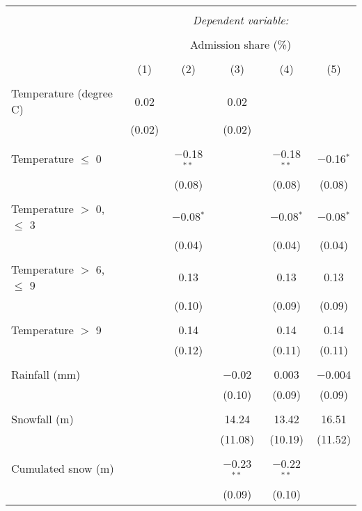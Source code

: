 
\begin{tabular}{@{\extracolsep{5pt}}lccccc} 
\\[-1.8ex]\hline 
\hline \\[-1.8ex] 
 & \multicolumn{5}{c}{\textit{Dependent variable:}} \\ 
\cline{2-6} 
\\[-1.8ex] & \multicolumn{5}{c}{Admission share (\%)} \\ 
\\[-1.8ex] & (1) & (2) & (3) & (4) & (5)\\ 
\hline \\[-1.8ex] 
 Temperature (degree C) & 0.02 &  & 0.02 &  &  \\ 
  & (0.02) &  & (0.02) &  &  \\ 
  & & & & & \\ 
 Temperature $\le$ 0 &  & $-$0.18$^{**}$ &  & $-$0.18$^{**}$ & $-$0.16$^{*}$ \\ 
  &  & (0.08) &  & (0.08) & (0.08) \\ 
  & & & & & \\ 
 Temperature $>$ 0, $\le$ 3 &  & $-$0.08$^{*}$ &  & $-$0.08$^{*}$ & $-$0.08$^{*}$ \\ 
  &  & (0.04) &  & (0.04) & (0.04) \\ 
  & & & & & \\ 
 Temperature $>$ 6, $\le$ 9 &  & 0.13 &  & 0.13 & 0.13 \\ 
  &  & (0.10) &  & (0.09) & (0.09) \\ 
  & & & & & \\ 
 Temperature $>$ 9 &  & 0.14 &  & 0.14 & 0.14 \\ 
  &  & (0.12) &  & (0.11) & (0.11) \\ 
  & & & & & \\ 
 Rainfall (mm) &  &  & $-$0.02 & 0.003 & $-$0.004 \\ 
  &  &  & (0.10) & (0.09) & (0.09) \\ 
  & & & & & \\ 
 Snowfall (m) &  &  & 14.24 & 13.42 & 16.51 \\ 
  &  &  & (11.08) & (10.19) & (11.52) \\ 
  & & & & & \\ 
 Cumulated snow (m) &  &  & $-$0.23$^{**}$ & $-$0.22$^{**}$ &  \\ 
  &  &  & (0.09) & (0.10) &  \\ 

\end{tabular}
